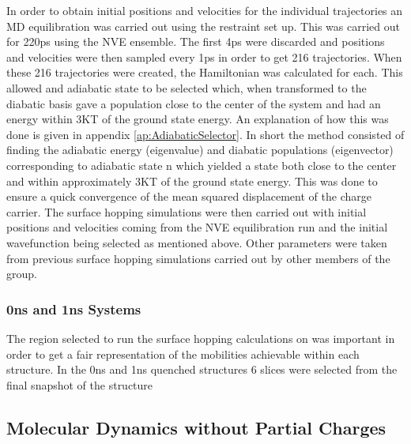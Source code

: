 In order to obtain initial positions and velocities for the individual trajectories an MD equilibration was carried out using the restraint set up. This was carried out for 220ps using the NVE ensemble. The first 4ps were discarded and positions and velocities were then sampled every 1ps in order to get 216 trajectories. When these 216 trajectories were created, the Hamiltonian was calculated for each. This allowed and adiabatic state to be selected which, when transformed to the diabatic basis gave a population close to the center of the system and had an energy within 3KT of the ground state energy. An explanation of how this was done is given in appendix \ref{ap:AdiabaticSelector}. In short the method consisted of finding the adiabatic energy (eigenvalue) and diabatic populations (eigenvector) corresponding to adiabatic state n which yielded a state both close to the center and within approximately 3KT of the ground state energy. This was done to ensure a quick convergence of the mean squared displacement of the charge carrier. The surface hopping simulations were then carried out with initial positions and velocities coming from the NVE equilibration run and the initial wavefunction being selected as mentioned above. Other parameters were taken from previous surface hopping simulations carried out by other members of the group.

\subsubsection{0ns and 1ns Systems}
The region selected to run the surface hopping calculations on was important in order to get a fair representation of the mobilities achievable within each structure. In the 0ns and 1ns quenched structures 6 slices were selected from the final snapshot of the structure

\clearpage
\subsection{Molecular Dynamics without Partial Charges}


\label{sect:partial_charge_importance}

